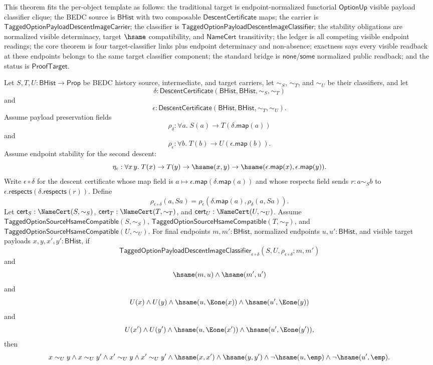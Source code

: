 \begin{theorem}
\label{thm:tagged-option-composite-image-classifier-normalized-visible-payload-clique}
This theorem fits the per-object template as follows: the traditional target is
endpoint-normalized functorial $\mathsf{OptionUp}$ visible payload classifier
clique; the BEDC source is $\mathsf{BHist}$ with two composable
$\mathsf{DescentCertificate}$ maps; the carrier is
$\mathsf{TaggedOptionPayloadDescentImageCarrier}$; the classifier is
$\mathsf{TaggedOptionPayloadDescentImageClassifier}$; the stability obligations
are normalized visible determinacy, target $\hsame$ compatibility, and
$\mathsf{NameCert}$ transitivity; the ledger is all competing visible endpoint
readings; the core theorem is four target-classifier links plus endpoint
determinacy and non-absence; exactness says every visible readback at these
endpoints belongs to the same target classifier component; the standard bridge
is $\mathsf{none}$/$\mathsf{some}$ normalized public readback; and the status is
$\mathsf{ProofTarget}$.

Let $S,T,U:\mathsf{BHist}\to\mathsf{Prop}$ be BEDC history source,
intermediate, and target carriers, let $\sim_S$, $\sim_T$, and $\sim_U$ be their
classifiers, and let
$$
\delta:\mathsf{DescentCertificate}(\mathsf{BHist},\mathsf{BHist},\sim_S,\sim_T)
$$
and
$$
\epsilon:\mathsf{DescentCertificate}(\mathsf{BHist},\mathsf{BHist},\sim_T,\sim_U).
$$
Assume payload preservation fields
$$
\rho_{\delta}:\forall a.\;S(a)\to T(\delta.\mathsf{map}(a))
$$
and
$$
\rho_{\epsilon}:\forall b.\;T(b)\to U(\epsilon.\mathsf{map}(b)).
$$
Assume endpoint stability for the second descent:
$$
\eta_{\epsilon}:\forall x\,y.\;
T(x)\to T(y)\to \hsame(x,y)\to
\hsame(\epsilon.\mathsf{map}(x),\epsilon.\mathsf{map}(y)).
$$
Write $\epsilon\circ\delta$ for the descent certificate whose map field is
$a\mapsto\epsilon.\mathsf{map}(\delta.\mathsf{map}(a))$ and whose respects field
sends $r:a\sim_S b$ to
$\epsilon.\mathsf{respects}(\delta.\mathsf{respects}(r))$. Define
$$
\rho_{\epsilon\circ\delta}(a,Sa)=
\rho_{\epsilon}(\delta.\mathsf{map}(a),\rho_{\delta}(a,Sa)).
$$
Let $\mathsf{cert}_S:\NameCert(S,\sim_S)$,
$\mathsf{cert}_T:\NameCert(T,\sim_T)$, and
$\mathsf{cert}_U:\NameCert(U,\sim_U)$. Assume
$\mathsf{TaggedOptionSourceHsameCompatible}(S,\sim_S)$,
$\mathsf{TaggedOptionSourceHsameCompatible}(T,\sim_T)$, and
$\mathsf{TaggedOptionSourceHsameCompatible}(U,\sim_U)$. For final endpoints
$m,m':\mathsf{BHist}$, normalized endpoints $u,u':\mathsf{BHist}$, and visible
target payloads $x,y,x',y':\mathsf{BHist}$, if
$$
\mathsf{TaggedOptionPayloadDescentImageClassifier}_{\epsilon\circ\delta}
(S,U,\rho_{\epsilon\circ\delta};m,m')
$$
and
$$
\hsame(m,u)\land \hsame(m',u')
$$
and
$$
U(x)\land U(y)\land
\hsame(u,\Eone(x))\land \hsame(u',\Eone(y))
$$
and
$$
U(x')\land U(y')\land
\hsame(u,\Eone(x'))\land \hsame(u',\Eone(y')),
$$
then
$$
x\sim_U y\land
x\sim_U y'\land
x'\sim_U y\land
x'\sim_U y'\land
\hsame(x,x')\land
\hsame(y,y')\land
\neg\hsame(u,\emp)\land
\neg\hsame(u',\emp).
$$
\end{theorem}
